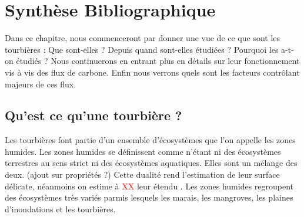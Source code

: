 
%	
%

\chapter{Synth\`{e}se Bibliographique}
\newpage


Dans ce chapitre, nous commenceront par donner une vue de ce que sont les tourbières : Que sont-elles ? Depuis quand sont-elles étudiées ? Pourquoi les a-t-on étudiés ?
Nous continuerons en entrant plus en détails sur leur fonctionnement vis à vis des flux de carbone.
Enfin nous verrons quels sont les facteurs contrôlant majeurs de ces flux.
\section{Qu'est ce qu'une tourbière ?}
Les tourbières font partie d'un ensemble d'écosystèmes que l'on appelle les zones humides.
Les zones humides se définissent comme n'étant ni des écosystèmes terrestres au sens strict ni des écosystèmes aquatiques.
Elles sont un mélange des deux. (ajout sur propriétés ?)
Cette dualité rend l'estimation de leur surface délicate, néanmoins on estime à \textcolor{red}{XX} leur étendu \plop.
Les zones humides regroupent des écosystèmes très variés parmis lesquels les marais, les mangroves, les plaines d'inondations et les tourbières.

